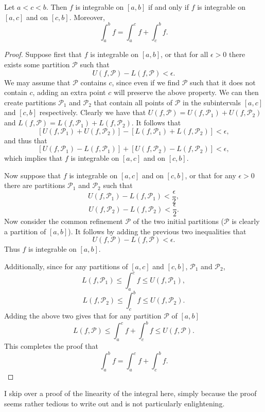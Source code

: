 \begin{theorem} \label{accbmeansab}
Let $a < c < b$. Then $f$ is integrable on $[a, b]$ if and only if $f$ is integrable on $[a, c]$ and on $[c, b]$. Moreover,
\[ \int_a^b f = \int_a^c f + \int_c^b f. \]
\begin{proof}
Suppose first that $f$ is integrable on $[a, b]$, or that for all $\epsilon > 0$ there exists some partition $\mathscr{P}$ such that 
\[ U(f, \mathscr{P}) - L(f, \mathscr{P}) < \epsilon. \]
We may assume that $\mathscr{P}$ contains $c$, since even if we find $\mathscr{P}$ such that it does not contain $c$, adding an extra point $c$ will preserve the above property. We can then create partitions $\mathscr{P}_1$ and $\mathscr{P}_2$ that contain all points of $\mathscr{P}$ in the subintervals $[a, c]$ and $[c, b]$ respectively. Clearly we have that $U(f, \mathscr{P}) = U(f, \mathscr{P}_1) + U(f, \mathscr{P}_2)$ and $L(f, \mathscr{P}) = L(f, \mathscr{P}_1) + L(f, \mathscr{P}_2)$. It follows that
\[ [U(f, \mathscr{P}_1) + U(f, \mathscr{P}_2)] - [L(f, \mathscr{P}_1) + L(f, \mathscr{P}_2)] < \epsilon, \]
and thus that
\[ [U(f, \mathscr{P}_1) - L(f, \mathscr{P}_1)] + [U(f, \mathscr{P}_2) - L(f, \mathscr{P}_2)] < \epsilon, \]
which implies that $f$ is integrable on $[a, c]$ and on $[c, b]$.

Now suppose that $f$ is integrable on $[a, c]$ and on $[c, b]$, or that for any $\epsilon > 0$ there are partitions $\mathscr{P}_1$ and $\mathscr{P}_2$ such that 
\[ U(f, \mathscr{P}_1) - L(f, \mathscr{P}_1) < \frac{\epsilon}2, \]
\[ U(f, \mathscr{P}_2) - L(f, \mathscr{P}_2) < \frac{\epsilon}2. \]
Now consider the common refinement $\mathscr{P}$ of the two initial partitions ($\mathscr{P}$ is clearly a partition of $[a, b]$). It follows by adding the previous two inequalities that 
\[ U(f, \mathscr{P}) - L(f, \mathscr{P}) < \epsilon. \]
Thus $f$ is integrable on $[a, b]$. 

Additionally, since for any partitions of $[a, c]$ and $[c, b]$, $\mathscr{P}_1$ and $\mathscr{P}_2$, 
\[ L(f, \mathscr{P}_1) \le \int_a^c f \le U(f, \mathscr{P}_1), \]
\[ L(f, \mathscr{P}_2) \le \int_c^b f \le U(f, \mathscr{P}_2). \]
Adding the above two gives that for any partition $\mathscr{P}$ of $[a, b]$
\[ L(f, \mathscr{P}) \le \int_a^c f + \int_c^b f \le U(f, \mathscr{P}). \]
This completes the proof that 
\[ \int_a^b f = \int_a^c f + \int_c^b f. \]
\end{proof}
\end{theorem}

I skip over a proof of the linearity of the integral here, simply because the proof seems rather tedious to write out and is not particularly enlightening. 

